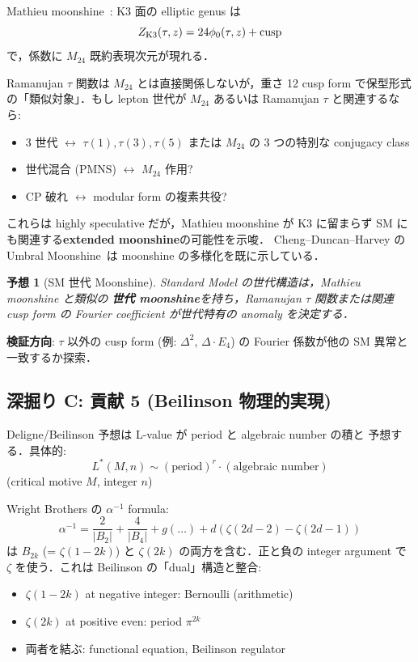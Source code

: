 \documentclass[11pt,a4paper]{article}
\newtheorem{conjecture}{予想}
\begin{document}
Mathieu moonshine~\cite{EOT2010}: K3 面の elliptic genus は
\begin{equation}
Z_{\rm K3}(\tau, z) = 24 \phi_0(\tau, z) + \text{cusp}
\end{equation}
で，係数に $M_{24}$ 既約表現次元が現れる．

Ramanujan $\tau$ 関数は $M_{24}$ とは直接関係しないが，重さ 12 cusp form
で保型形式の「類似対象」．もし lepton 世代が $M_{24}$ あるいは
Ramanujan $\tau$ と関連するなら:

\begin{itemize}
\item 3 世代 $\leftrightarrow$ $\tau(1), \tau(3), \tau(5)$ または
$M_{24}$ の 3 つの特別な conjugacy class
\item 世代混合 (PMNS) $\leftrightarrow$ $M_{24}$ 作用?
\item CP 破れ $\leftrightarrow$ modular form の複素共役?
\end{itemize}

これらは highly speculative だが，Mathieu moonshine が K3 に留まらず
SM にも関連する\textbf{extended moonshine}の可能性を示唆．
Cheng--Duncan--Harvey の Umbral Moonshine~\cite{CDH2014}は moonshine
の多様化を既に示している．

\begin{conjecture}[SM 世代 Moonshine]
Standard Model の世代構造は，Mathieu moonshine と類似の
\textbf{世代 moonshine}を持ち，Ramanujan $\tau$ 関数または関連
cusp form の Fourier coefficient が世代特有の anomaly を決定する．
\end{conjecture}

\textbf{検証方向}: $\tau$ 以外の cusp form (例: $\Delta^2$, $\Delta \cdot E_4$)
の Fourier 係数が他の SM 異常と一致するか探索．

\subsection{深掘り C: 貢献 5 (Beilinson 物理的実現)}

Deligne/Beilinson 予想は L-value が period と algebraic number の積と
予想する．具体的:
\begin{equation}
L^*(M, n) \sim (\text{period})^r \cdot (\text{algebraic number})
\end{equation}
(critical motive $M$, integer $n$)

Wright Brothers の $\alpha^{-1}$ formula:
\begin{equation}
\alpha^{-1} = \frac{2}{|B_2|} + \frac{4}{|B_4|} + g(\ldots) + d(\zeta(2d-2) - \zeta(2d-1))
\end{equation}
は $B_{2k}$ (= $\zeta(1-2k)$) と $\zeta(2k)$ の両方を含む．正と負の
integer argument で $\zeta$ を使う．これは Beilinson の「dual」構造と整合:
\begin{itemize}
\item $\zeta(1-2k)$ at negative integer: Bernoulli (arithmetic)
\item $\zeta(2k)$ at positive even: period $\pi^{2k}$
\item 両者を結ぶ: functional equation, Beilinson regulator
\end{itemize}
\end{document}
